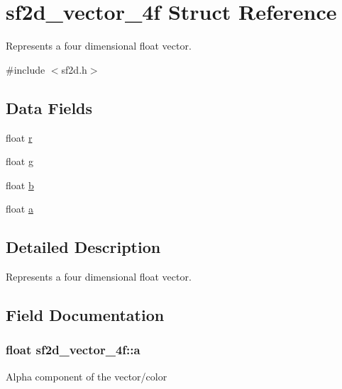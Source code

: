 \hypertarget{structsf2d__vector__4f}{}\section{sf2d\+\_\+vector\+\_\+4f Struct Reference}
\label{structsf2d__vector__4f}


Represents a four dimensional float vector.  




{\ttfamily \#include $<$sf2d.\+h$>$}

\subsection*{Data Fields}
\begin{DoxyCompactItemize}
\item 
float \hyperlink{structsf2d__vector__4f_a9b6406bf98af7640a13a9027b64c7b04}{r}
\item 
float \hyperlink{structsf2d__vector__4f_a1c6ed8a78238cc48834cfdd3022efa3c}{g}
\item 
float \hyperlink{structsf2d__vector__4f_a086d3a04d19322849a3ffa1e01f18c41}{b}
\item 
float \hyperlink{structsf2d__vector__4f_aac68efbadd85967e74d917970f595823}{a}
\end{DoxyCompactItemize}


\subsection{Detailed Description}
Represents a four dimensional float vector. 

\subsection{Field Documentation}
\hypertarget{structsf2d__vector__4f_aac68efbadd85967e74d917970f595823}{}
\subsubsection[{a}]{\setlength{\rightskip}{0pt plus 5cm}float sf2d\+\_\+vector\+\_\+4f\+::a}\label{structsf2d__vector__4f_aac68efbadd85967e74d917970f595823}
Alpha component of the vector/color \hypertarget{structsf2d__vector__4f_a086d3a04d19322849a3ffa1e01f18c41}{}
